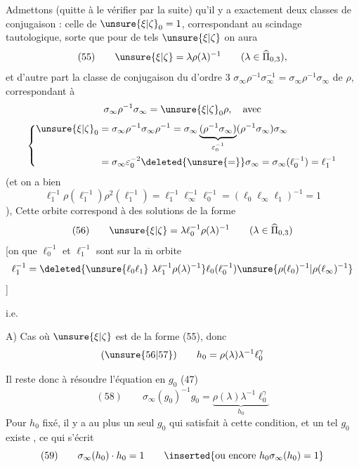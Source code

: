 
Admettons (quitte à le vérifier par la suite) qu'il y a exactement deux classes de conjugaison : celle de $\unsure{\xi|\zeta}_0=1$, correspondant au scindage tautologique,  sorte que pour de tels $\unsure{\xi|\zeta}$ on aura
\[
(55)\qquad \unsure{\xi|\zeta}=\lambda\rho(\lambda)^{-1}
\qquad(\lambda\in\widehat{\Pi}_{0,3}),
\]
et d'autre part la classe de conjugaison du  d'ordre 3 $\sigma_\infty\rho^{-1}\sigma_\infty^{-1}=\sigma_\infty\rho^{-1}\sigma_\infty$ de $\rho$, correspondant à
\[
\sigma_\infty\rho^{-1}\sigma_\infty=\unsure{\xi|\zeta}_0\rho,\quad\text{avec}
\]
\[
\left\{\begin{aligned}
\unsure{\xi|\zeta}_0&=\sigma_\infty\rho^{-1}\sigma_\infty\rho^{-1}
=\sigma_\infty\underbrace{(\rho^{-1}\sigma_\infty)}_{\varepsilon_0^{-1}}(\rho^{-1}\sigma_\infty)\sigma_\infty\\
&=\sigma_\infty\varepsilon_0^{-2}\deleted{\unsure{=}}\sigma_\infty
=\sigma_\infty(\ell_0^{-1})=\ell_1^{-1}
\end{aligned}\right.
\]
(et on a bien
\[
\ell_1^{-1}\rho(\ell_1^{-1})\rho^2(\ell_1^{-1})
=\ell_1^{-1}\ell_\infty^{-1}\ell_0^{-1}
=(\ell_0\ell_\infty\ell_1)^{-1}=1
\]
), Cette orbite correspond à des solutions de la forme 
\[
(56)\qquad \unsure{\xi|\zeta}=\lambda\ell_0^{-1}\rho(\lambda)^{-1}
\qquad(\lambda\in\widehat{\Pi}_{0,3})
\]
[on  que $\ell_0^{-1}$ et $\ell_1^{-1}$ sont sur la $\overline{\mathrm m}$ orbite
\[
\ell_1^{-1}=\deleted{\unsure{\ell_0\ell_1}\ \lambda\ell_1^{-1}\rho(\lambda)^{-1}}
\ell_0(\ell_0^{-1})\unsure{\rho(\ell_0)^{-1}|\rho(\ell_\infty)^{-1}}
\]
]

i.e. 


A) Cas  où $\unsure{\xi|\zeta}$ est de la forme (55), donc
\[
(\unsure{56|57})\qquad h_0=\rho(\lambda)\lambda^{-1}\ell_0^\gamma
\]


Il reste donc à résoudre l'équation en $g_0$ (47)
\[
(58)\qquad
\sigma_\infty(g_0)^{-1}g_0
=\underbrace{\rho(\lambda)\lambda^{-1}\ell_0^\gamma}_{h_0}
\]
Pour  $h_0$ fixé, il y a au plus un seul $g_0$ qui satisfait à cette condition, et un tel $g_0$ existe  , ce qui s'écrit
\[
(59)\qquad \sigma_\infty(h_0)\cdot h_0=1
\qquad\inserted{\text{ou encore }h_0\sigma_\infty(h_0)=1}
\]

